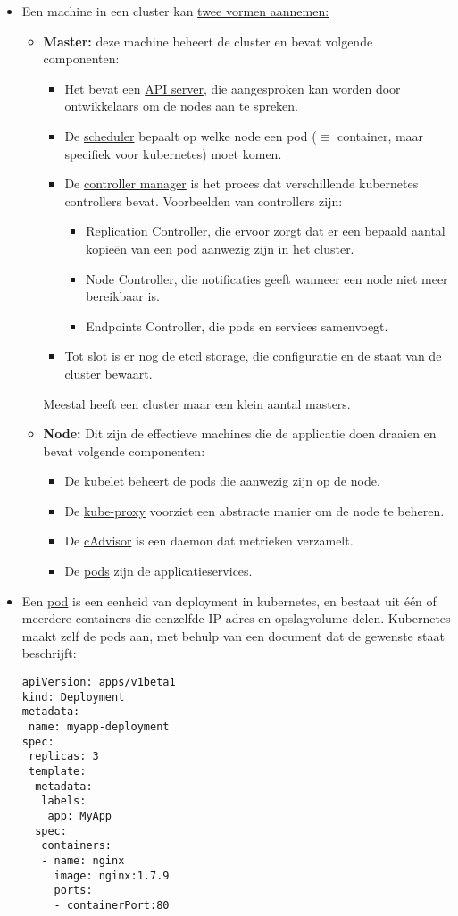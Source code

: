 	\begin{itemize}
		\item  Een machine in een cluster kan \underline{twee vormen aannemen:}
		\begin{itemize}
			\item  \textbf{Master:} deze machine beheert de cluster en bevat volgende componenten:
			\begin{itemize}
				\item Het bevat een \underline{API server}, die aangesproken kan worden door ontwikkelaars om de nodes aan te spreken.
				\item De \underline{scheduler} bepaalt op welke node een pod ($\equiv$ container, maar specifiek voor kubernetes) moet komen.
				\item De \underline{controller manager} is het proces dat verschillende kubernetes controllers bevat. Voorbeelden van controllers zijn:
				\begin{itemize}
					\item Replication Controller, die ervoor zorgt dat er een bepaald aantal kopieën van een pod aanwezig zijn in het cluster.
					\item Node Controller, die notificaties geeft wanneer een node niet meer bereikbaar is.
					\item Endpoints Controller, die pods en services samenvoegt.
				\end{itemize}
				\item Tot slot is er nog de \underline{etcd} storage, die configuratie en de staat van de cluster bewaart.
			\end{itemize}

			Meestal heeft een cluster maar een klein aantal masters.
			\item  \textbf{Node:} Dit zijn de effectieve machines die de applicatie doen draaien en bevat volgende componenten:
			\begin{itemize}
				\item De \underline{kubelet} beheert de pods die aanwezig zijn op de node.
				\item De \underline{kube-proxy} voorziet een abstracte manier om de node te beheren.
				\item De \underline{cAdvisor} is een daemon dat metrieken verzamelt.
				\item De \underline{pods} zijn de applicatieservices. 
			\end{itemize}
		\end{itemize}

		\item  Een \underline{pod} is een eenheid van deployment in kubernetes, en bestaat uit één of meerdere containers die eenzelfde IP-adres en opslagvolume delen. Kubernetes maakt zelf de pods aan, met behulp van een document dat de gewenste staat beschrijft:
		\begin{lstlisting}
apiVersion: apps/v1beta1
kind: Deployment
metadata:
 name: myapp-deployment
spec:
 replicas: 3
 template:
  metadata:
   labels:
	app: MyApp
  spec:
   containers:
   - name: nginx
	 image: nginx:1.7.9
	 ports:
	 - containerPort:80
		\end{lstlisting}


\end{itemize}
